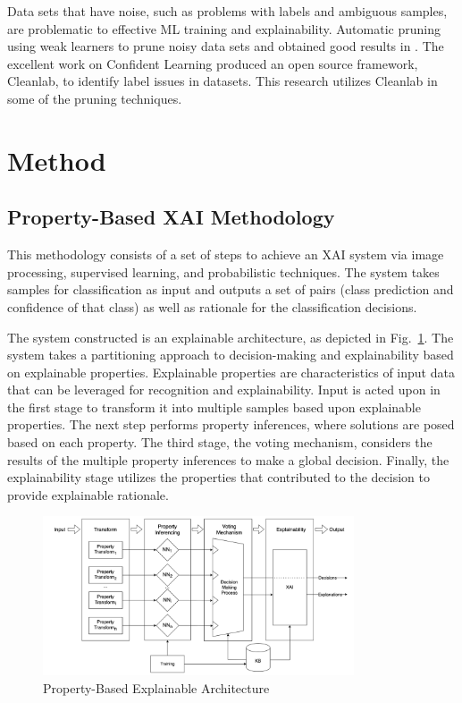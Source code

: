 \documentclass[conference]{IEEEtran}
\begin{document}
Data sets that have noise, such as problems with labels and ambiguous samples,
are problematic to effective ML training and explainability. Automatic pruning
using weak learners to prune noisy data sets and obtained good results in
\cite{angelova05}.  The excellent work on Confident Learning\cite{northcutt2021}
produced an open source framework, Cleanlab, to identify label issues in
datasets.  This research utilizes Cleanlab in some of the pruning techniques.

\section{Method}
\label{method}

\subsection{Property-Based XAI Methodology}

This methodology consists of a set of steps to achieve an XAI system via image
processing, supervised learning, and probabilistic techniques. The system takes
samples for classification as input and outputs a set of pairs (class prediction
and confidence of that class) as well as rationale for the classification
decisions.

The system constructed is an explainable architecture, as depicted in
Fig.~\ref{fig:xai_data_pipeline}.  The system takes a partitioning approach to
decision-making and explainability based on explainable properties.  Explainable
properties are characteristics of input data that can be leveraged for
recognition and explainability.  Input is acted upon in the first stage to
transform it into multiple samples based upon explainable properties. The next
step performs property inferences, where solutions are posed based on each
property. The third stage, the voting mechanism, considers the results of the
multiple property inferences to make a global decision. Finally, the
explainability stage utilizes the properties that contributed to the decision to
provide explainable rationale.

\begin{figure}
    \includegraphics[width=9.2cm]{./images/xai-pipeline.png}
    \caption{Property-Based Explainable Architecture}
    \label{fig:xai_data_pipeline}
\end{figure}
\end{document}
